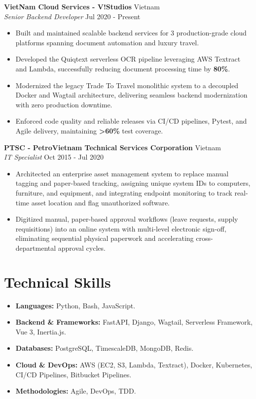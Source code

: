 \documentclass[10pt]{article}
\begin{document}
\textbf{VietNam Cloud Services - V!Studios} \hfill Vietnam \\
\textit{Senior Backend Developer} \hfill Jul 2020 - Present
\begin{itemize}[itemsep=1pt, topsep=2pt]
    \item Built and maintained scalable backend services for 3 production-grade cloud platforms spanning document automation and luxury travel.
    \item Developed the Quiqtext serverless OCR pipeline leveraging AWS Textract and Lambda, successfully reducing document processing time by \textbf{80\%}.
    \item Modernized the legacy Trade To Travel monolithic system to a decoupled Docker and Wagtail architecture, delivering seamless backend modernization with zero production downtime.
    \item Enforced code quality and reliable releases via CI/CD pipelines, Pytest, and Agile delivery, maintaining \textbf{>60\%} test coverage.
\end{itemize}

\vspace{6pt}

\textbf{PTSC - PetroVietnam Technical Services Corporation} \hfill Vietnam \\
\textit{IT Specialist} \hfill Oct 2015 - Jul 2020
\begin{itemize}[itemsep=1pt, topsep=2pt]
    \item Architected an enterprise asset management system to replace manual tagging and paper-based tracking, assigning unique system IDs to computers, furniture, and equipment, and integrating endpoint monitoring to track real-time asset location and flag unauthorized software.
    \item Digitized manual, paper-based approval workflows (leave requests, supply requisitions) into an online system with multi-level electronic sign-off, eliminating sequential physical paperwork and accelerating cross-departmental approval cycles.
\end{itemize}

\section{Technical Skills}
\begin{itemize}[itemsep=1pt, topsep=2pt, leftmargin=*]
    \item \textbf{Languages:} Python, Bash, JavaScript.
    \item \textbf{Backend \& Frameworks:} FastAPI, Django, Wagtail, Serverless Framework, Vue 3, Inertia.js.
    \item \textbf{Databases:} PostgreSQL, TimescaleDB, MongoDB, Redis.
    \item \textbf{Cloud \& DevOps:} AWS (EC2, S3, Lambda, Textract), Docker, Kubernetes, CI/CD Pipelines, Bitbucket Pipelines.
    \item \textbf{Methodologies:} Agile, DevOps, TDD.
\end{itemize}
\end{document}
